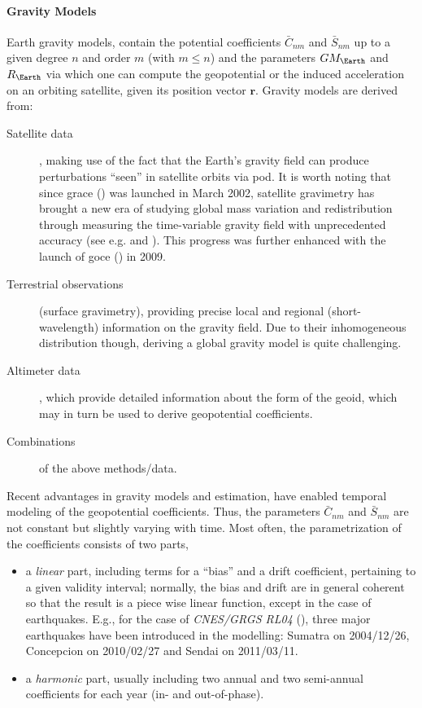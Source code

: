 \paragraph{Gravity Models}\label{par:gravity-models}

Earth gravity models, contain the potential coefficients $\bar{C}_{nm}$ and $\bar{S}_{nm}$ 
up to a given degree $n$ and order $m$ (with $m \le n$) and the parameters $GM_{\Earth}$ 
and $R_{\Earth}$ via which one can compute the geopotential or the induced acceleration 
on an orbiting satellite, given its position vector $\bm{r}$. Gravity models are derived from:
\begin{description}
  \item[Satellite data], making use of the fact that the Earth's gravity field 
    can produce perturbations ``seen'' in satellite orbits via \gls{pod}. It is worth 
    noting that since \gls{grace} (\cite{Tapley2004b}) was launched in March 2002, satellite 
    gravimetry has brought a new era of studying global mass variation and redistribution 
    through measuring the time-variable gravity field with unprecedented accuracy 
    (see e.g. \cite{Chen2022} and \cite{Jaggi2023}). This progress was further enhanced 
    with the launch of \gls{goce} (\cite{Johannessen2003}) in 2009.
  \item[Terrestrial observations] (surface gravimetry), providing precise local 
    and regional (short-wavelength) information on the gravity field. Due to their 
    inhomogeneous distribution though, deriving a global gravity model is quite challenging.
  \item[Altimeter data], which provide detailed information about the form of the 
    geoid, which may in turn be used to derive geopotential coefficients.
  \item[Combinations] of the above methods/data.
\end{description}

Recent advantages in gravity models and estimation, have enabled temporal modeling 
of the geopotential coefficients. Thus, the parameters $\bar{C}_{nm}$ and 
$\bar{S}_{nm}$ are not constant but slightly varying with time. Most often, the 
parametrization of the coefficients consists of two parts, 
\begin{itemize}
  \item a \emph{linear} part, including terms for a ``bias'' and a drift coefficient, pertaining 
    to a given validity interval; normally, the bias and drift are in general coherent 
    so that the result is a piece wise linear function, except in the case of earthquakes.
    E.g., for the case of \emph{CNES/GRGS RL04} (\cite{Lemoine2019}), three major 
    earthquakes have been introduced in the modelling: Sumatra on 2004/12/26, Concepcion 
    on 2010/02/27 and Sendai on 2011/03/11.
  \item a \emph{harmonic} part, usually including two annual and two semi-annual 
    coefficients for each year (in- and out-of-phase).
\end{itemize}

